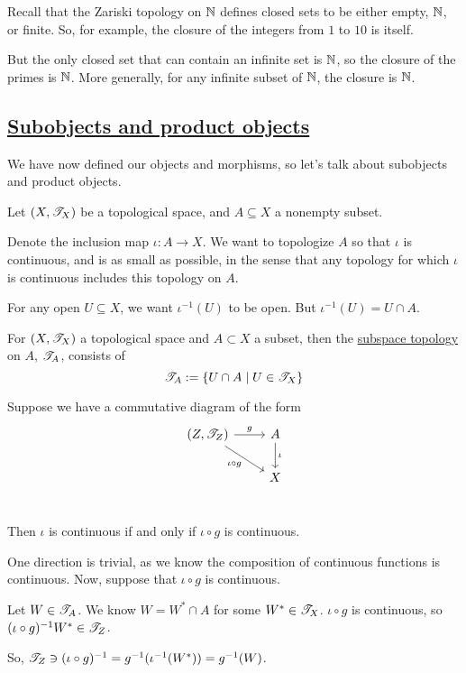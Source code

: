 \documentclass[x11names,reqno,14pt]{extarticle}
\begin{document}
Recall that the Zariski topology on $\mathbb{N}$ defines closed sets to be either empty, $\mathbb{N}$, or finite. So, for example, the closure of the integers from $1$ to $10$ is itself. 

But the only closed set that can contain an infinite set is $\mathbb{N}$, so the closure of the primes is $\mathbb{N}$. More generally, for any infinite subset of $\mathbb{N}$, the closure is $\mathbb{N}$. 

\subsection*{\underline{Subobjects and product objects}}

We have now defined our objects and morphisms, so let's talk about subobjects and product objects. 

Let $(X, \mathscr{T}_X)$ be a topological space, and $A\subseteq X$ a nonempty subset. 

Denote the inclusion map $\iota:A\to X$. We want to topologize $A$ so that $\iota$ is continuous, and is as small as possible, in the sense that any topology for which $\iota$ is continuous includes this topology on $A$. 

For any open $U\subseteq X$, we want $\iota^{-1}(U)$ to be open. But $\iota^{-1}(U) = U \cap A$. 


For $(X, \mathscr{T}_X)$ a topological space and $A\subset X$ a subset, then the \underline{subspace topology} on $A$, $\mathscr{T}_A$, consists of 
\[
\mathscr{T}_A := \{U \cap A \mid U \in \mathscr{T}_X\}
\]

\prop

Suppose we have a commutative diagram of the form 
\[
\begin{tikzcd}
(Z, \ms{T}_Z) \arrow[rd, "\iota \circ g"'] \arrow[r, "g"] & A \arrow[d, "\iota"] \\
& X \\
\end{tikzcd}
\]

Then $\iota$ is continuous if and only if $\iota \circ g$ is continuous. 

\proof

One direction is trivial, as we know the composition of continuous functions is continuous. Now, suppose that $\iota \circ g$ is continuous. 

Let $W \in \mathscr{T}_A$. We know $W = W^*\cap A$ for some $W^* \in \mathscr{T}_X$. $\iota \circ g$ is continuous, so $(\iota \circ g)^{-1}W^*\in\mathscr{T}_Z$. 

So, $\mathscr{T}_Z\ni(\iota\circ g)^{-1} = g^{-1}(\iota^{-1}(W^*)) = g^{-1}(W)$. 
\end{document}
